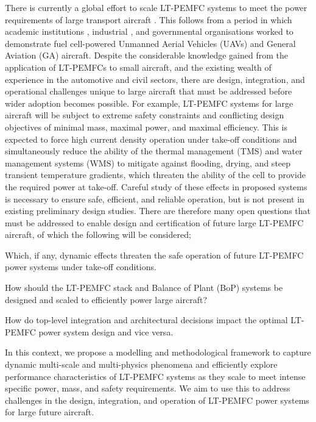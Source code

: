 There is currently a global effort to scale LT-PEMFC systems to meet the power requirements of large transport aircraft \cite{weeksZeroAviaReceivesFAA2025, retallackCommercialAircraftManufacturer2023, matousekNEWBORNNExtGeneration2023, woodScalabilityHydrogenFuel2024}.
This follows from a period in which academic institutions \cite{kalloFuelCellSystems2013}, industrial \cite{lapena-reyFirstFuelCellManned2010}, and governmental organisations \cite{noll2004investigation} worked to demonstrate fuel cell-powered Unmanned Aerial Vehicles (UAVs) and General Aviation (GA) aircraft.
Despite the considerable knowledge gained from the application of LT-PEMFCs to small aircraft, and the existing wealth of experience in the automotive and civil sectors, there are  design, integration, and operational challenges unique to large aircraft that must be addressed before wider adoption becomes possible.
For example, LT-PEMFC systems for large aircraft will be subject to extreme safety constraints and conflicting design objectives of minimal mass, maximal power, and maximal efficiency. This is expected to force high current density operation under take-off conditions and simultaneously reduce the ability of the thermal management (TMS) and water management systems (WMS) to mitigate against flooding, drying, and steep transient temperature gradients, which threaten the ability of the cell to provide the required power at take-off.
Careful study of these effects in proposed systems is necessary to ensure safe, efficient, and reliable operation, but is not present in existing preliminary design studies.
There are therefore many open questions that must be addressed to enable design and certification of future large LT-PEMFC aircraft, of which the following will be considered; \begin{enumerate*}
	\item Which, if any, dynamic effects threaten the safe operation of future LT-PEMFC power systems under take-off conditions.
	\item How should the LT-PEMFC stack and Balance of Plant (BoP) systems be designed and scaled to efficiently power large aircraft?
	\item How do top-level integration and architectural decisions impact the optimal LT-PEMFC power system design and vice versa.
\end{enumerate*}

In this context, we propose a modelling and methodological framework to capture dynamic multi-scale and multi-physics phenomena and efficiently explore performance characteristics of LT-PEMFC systems as they scale to meet intense specific power, mass, and safety requirements.
We aim to use this to address challenges in the design, integration, and operation of LT-PEMFC power systems for large \textbf{}future aircraft.

